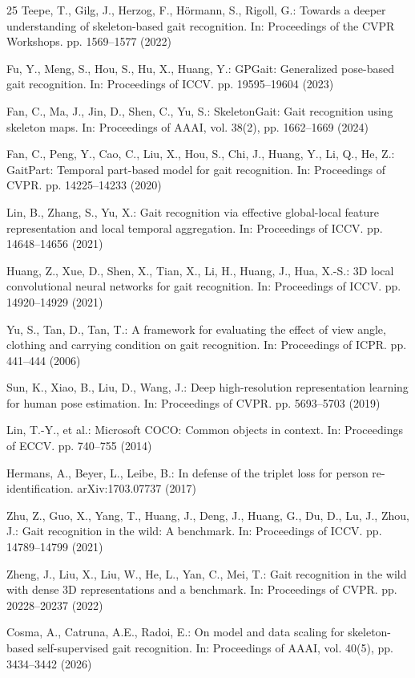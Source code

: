 \documentclass[runningheads]{llncs}
\begin{document}
\begin{thebibliography}{25}
Teepe, T., Gilg, J., Herzog, F., H\"ormann, S., Rigoll, G.:
Towards a deeper understanding of skeleton-based gait recognition.
In: Proceedings of the CVPR Workshops. pp. 1569--1577 (2022)

Fu, Y., Meng, S., Hou, S., Hu, X., Huang, Y.:
GPGait: Generalized pose-based gait recognition.
In: Proceedings of ICCV. pp. 19595--19604 (2023)

Fan, C., Ma, J., Jin, D., Shen, C., Yu, S.:
SkeletonGait: Gait recognition using skeleton maps.
In: Proceedings of AAAI, vol. 38(2), pp. 1662--1669 (2024)

Fan, C., Peng, Y., Cao, C., Liu, X., Hou, S., Chi, J., Huang, Y., Li, Q., He, Z.:
GaitPart: Temporal part-based model for gait recognition.
In: Proceedings of CVPR. pp. 14225--14233 (2020)

Lin, B., Zhang, S., Yu, X.:
Gait recognition via effective global-local feature representation and local
temporal aggregation. In: Proceedings of ICCV. pp. 14648--14656 (2021)

Huang, Z., Xue, D., Shen, X., Tian, X., Li, H., Huang, J., Hua, X.-S.:
3D local convolutional neural networks for gait recognition.
In: Proceedings of ICCV. pp. 14920--14929 (2021)

Yu, S., Tan, D., Tan, T.:
A framework for evaluating the effect of view angle, clothing and carrying
condition on gait recognition. In: Proceedings of ICPR. pp. 441--444 (2006)

Sun, K., Xiao, B., Liu, D., Wang, J.:
Deep high-resolution representation learning for human pose estimation.
In: Proceedings of CVPR. pp. 5693--5703 (2019)

Lin, T.-Y., et al.:
Microsoft COCO: Common objects in context.
In: Proceedings of ECCV. pp. 740--755 (2014)

Hermans, A., Beyer, L., Leibe, B.:
In defense of the triplet loss for person re-identification.
arXiv:1703.07737 (2017)

Zhu, Z., Guo, X., Yang, T., Huang, J., Deng, J., Huang, G., Du, D., Lu, J.,
Zhou, J.:
Gait recognition in the wild: A benchmark.
In: Proceedings of ICCV. pp. 14789--14799 (2021)

Zheng, J., Liu, X., Liu, W., He, L., Yan, C., Mei, T.:
Gait recognition in the wild with dense 3D representations and a benchmark.
In: Proceedings of CVPR. pp. 20228--20237 (2022)

Cosma, A., Catruna, A.E., Radoi, E.:
On model and data scaling for skeleton-based self-supervised gait recognition.
In: Proceedings of AAAI, vol. 40(5), pp. 3434--3442 (2026)

\end{thebibliography}
\end{document}
